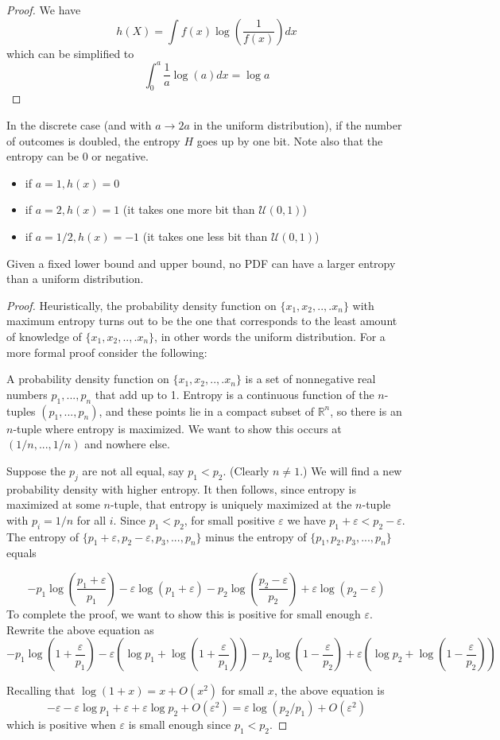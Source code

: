\documentclass[11pt]{article}
\theoremstyle{definition}
\begin{document}
\begin{proof}
We have $$h(X) = \int f(x) \log \left(\frac{1}{f(x)} \right) dx$$which can be simplified to $$\int_0^a \frac{1}{a} \log(a) dx = \log a$$
\end{proof}
\remark In the discrete case (and with $a \rightarrow 2a$ in the uniform distribution), if the number of outcomes is doubled, the entropy $H$ goes up by one bit. Note also that the entropy can be 0 or negative.
\begin{itemize}
\item if $a = 1, h(x) = 0$
\item if $a = 2, h(x) = 1$ (it takes one more bit than $\mathcal{U}(0, 1)$)
\item if $a = 1/2, h(x) = -1$ (it takes one less bit than $\mathcal{U}(0, 1)$)
\end{itemize}

\theorem Given a fixed lower bound and upper bound, no PDF can have a larger entropy than a uniform distribution. 

\begin{proof}
Heuristically, the probability density function on $\{x_1, x_2,..,.x_n\}$ with maximum entropy turns out to be the one that corresponds to the least amount of knowledge of $\{x_1, x_2,..,.x_n\}$, in other words the uniform distribution. For a more formal proof consider the following:

A probability density function on $\{x_1, x_2,..,.x_n\}$  is a set of nonnegative real numbers $p_1,...,p_n$ that add up to 1. Entropy is a continuous function of the $n$-tuples $(p_1,...,p_n)$, and these points lie in a compact subset of $\mathbb{R}^n$, so there is an $n$-tuple where entropy is maximized. We want to show this occurs at $(1/n,...,1/n)$ and nowhere else.

Suppose the $p_j$ are not all equal, say $p_1 < p_2$. (Clearly $n\neq 1$.) We will find a new probability density with higher entropy. It then follows, since entropy is maximized at
some $n$-tuple, that entropy is uniquely maximized at the $n$-tuple with $p_i = 1/n$ for all $i$. Since $p_1 < p_2$, for small positive $\varepsilon$ we have $p_1 + \varepsilon < p_2 -\varepsilon$. The entropy of $\{p_1 + \varepsilon, p_2 -\varepsilon,p_3,...,p_n\}$ minus the entropy of $\{p_1,p_2,p_3,...,p_n\}$ equals

$$-p_1\log\left(\frac{p_1+\varepsilon}{p_1}\right)-\varepsilon\log(p_1+\varepsilon)-p_2\log\left(\frac{p_2-\varepsilon}{p_2}\right)+\varepsilon\log(p_2-\varepsilon)$$
To complete the proof, we want to show this is positive for small enough $\varepsilon$. Rewrite the above equation as
$$-p_1\log\left(1+\frac{\varepsilon}{p_1}\right)-\varepsilon\left(\log p_1+\log\left(1+\frac{\varepsilon}{p_1}\right)\right)-p_2\log\left(1-\frac{\varepsilon}{p_2}\right)+\varepsilon\left(\log p_2+\log\left(1-\frac{\varepsilon}{p_2}\right)\right)$$

\noindent Recalling that $\log(1 + x) = x + O(x^2)$ for small $x$, the above equation is
$$-\varepsilon-\varepsilon\log p_1 + \varepsilon + \varepsilon \log p_2 + O(\varepsilon^2) = \varepsilon\log(p_2/p_1) + O(\varepsilon^2)$$
which is positive when $\varepsilon$ is small enough since $p_1 < p_2$.

\end{proof}
\end{document}
